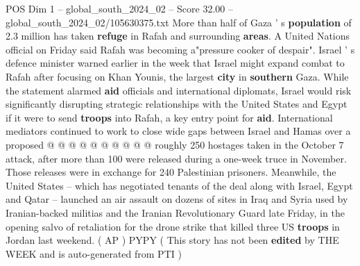 \begin{textsample}{POS Dim 1 – global\_south\_2024\_02 – Score 32.00 – global\_south\_2024\_02/105630375.txt}
More than half of Gaza ' s \textbf{population} of 2.3 million has taken \textbf{refuge} in Rafah and surrounding \textbf{areas}.
A United Nations official on Friday said Rafah was becoming a"pressure cooker of despair".
Israel ' s defence minister warned earlier in the week that Israel might expand combat to Rafah after focusing on Khan Younis, the largest \textbf{city} in \textbf{southern} Gaza.
While the statement alarmed \textbf{aid} officials and international diplomats, Israel would risk significantly disrupting strategic relationships with the United States and Egypt if it were to send \textbf{troops} into Rafah, a key entry point for \textbf{aid}.
International mediators continued to work to close wide gaps between Israel and Hamas over a proposed @ @ @ @ @ @ @ @ @ @ roughly 250 hostages taken in the October 7 attack, after more than 100 were released during a one-week truce in November.
Those releases were in exchange for 240 Palestinian prisoners.
Meanwhile, the United States -- which has negotiated tenants of the deal along with Israel, Egypt and Qatar -- launched an air assault on dozens of sites in Iraq and Syria used by Iranian-backed militias and the Iranian Revolutionary Guard late Friday, in the opening salvo of retaliation for the drone strike that killed three US \textbf{troops} in Jordan last weekend. ( AP ) PYPY ( This story has not been \textbf{edited} by THE WEEK and is auto-generated from PTI )

\end{textsample}
